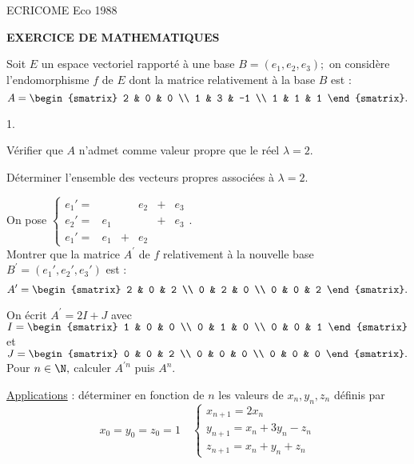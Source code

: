 \documentclass[11pt]{article}%
\begin{document}
\begin{center}
{\Huge ECRICOME Eco 1988}
\end{center}

\begin{center}
\textbf{EXERCICE DE MATHEMATIQUES}
\end{center}

Soit $E$ un espace vectoriel rapporté à une base $B =
(e_{1},e_{2},e_{3});$ on
considère l'endomorphisme $f$ de $E$ dont la matrice relativement à la
base $B$ est :
\[
A = 
\begin{smatrix}
2 & 0 & 0 \\
1 & 3 & -1 \\
1 & 1 & 1
\end{smatrix}.
\]

\begin{noliste}{1.}
 \setlength{\itemsep}{4mm}
\item Vérifier que $A$ n'admet comme valeur propre que le réel $\lambda
= 2.$

\item Déterminer l'ensemble des vecteurs propres associées à $\lambda =
2.$

\item On pose $\left\{ 
\begin{array}{cccccc}
e_{1}{\prime } = & & & e_{2} & + & e_{3} \\
e_{2}{\prime } = & e_{1} & & & + & e_{3} \\
e_{1}{\prime } = & e_{1} & + & e_{2} & & 
\end{array}
\right..$\\
Montrer que la matrice $A^{\prime }$ de $f$ relativement à la nouvelle
base $B^{\prime } = (e_{1}{\prime },e_{2}{\prime },e_{3}{\prime })$ est
:
\[
A^{\prime } = 
\begin{smatrix}
2 & 0 & 2 \\
0 & 2 & 0 \\
0 & 0 & 2
\end{smatrix}.
\]

\item On écrit $A^{\prime } = 2I + J$ avec $I = 
\begin{smatrix}
1 & 0 & 0 \\
0 & 1 & 0 \\
0 & 0 & 1
\end{smatrix}
$ et $J = 
\begin{smatrix}
0 & 0 & 2 \\
0 & 0 & 0 \\
0 & 0 & 0
\end{smatrix}.$\\
Pour $n\in \N,$ calculer $A^{\prime n}$ puis $A^{n}.$

\item \underline{Applications} : déterminer en fonction de $n$ les
valeurs
de $x_{n},y_{n},z_{n}$ définis par 
\[
x_{0} = y_{0} = z_{0} = 1\quad \left\{ 
\begin{array}{l}
x_{n + 1} = 2x_{n} \\
y_{n + 1} = x_{n} + 3y_{n}-z_{n} \\
z_{n + 1} = x_{n} + y_{n} + z_{n}
\end{array}
\right. 
\]
\end{noliste}
\end{document}

